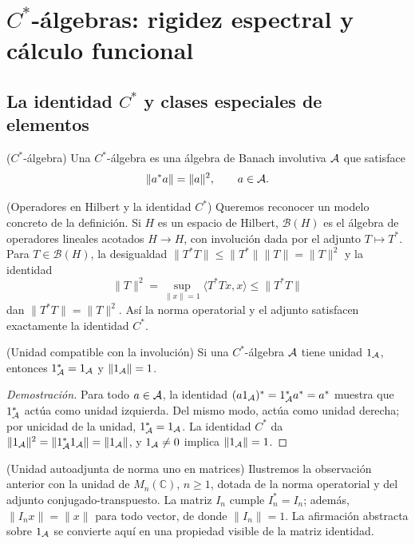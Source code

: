 \chapter{$C^*$-álgebras: rigidez espectral y cálculo funcional}

\section{La identidad $C^*$ y clases especiales de elementos}

\begin{cthdefinicion}{($C^*$-álgebra)}
Una $C^*$-álgebra es una álgebra de Banach involutiva $\mathcal A$ que satisface
\[
 \|a^*a\|=\|a\|^2,
 \qquad a\in\mathcal A.
\]
\end{cthdefinicion}

\begin{cthejemplo}{(Operadores en Hilbert y la identidad $C^*$)}
Queremos reconocer un modelo concreto de la definición. Si $H$ es un
espacio de Hilbert, $\mathcal B(H)$ es el álgebra de operadores lineales
acotados $H\to H$, con involución dada por el adjunto $T\mapsto T^*$.
Para $T\in\mathcal B(H)$, la desigualdad
$\|T^*T\|\le\|T^*\|\|T\|=\|T\|^2$ y la identidad
\[
 \|T\|^2=\sup_{\|x\|=1}\langle T^*Tx,x\rangle
 \le\|T^*T\|
\]
dan $\|T^*T\|=\|T\|^2$. Así la norma operatorial y el adjunto
satisfacen exactamente la identidad $C^*$.
\end{cthejemplo}

\begin{cthobservacion}{(Unidad compatible con la involución)}
Si una $C^*$-álgebra $\mathcal A$ tiene unidad $1_\mathcal A$, entonces
$1_\mathcal A^*=1_\mathcal A$ y $\|1_\mathcal A\|=1$.
\end{cthobservacion}

\begin{proof}[Demostración]
Para todo $a\in\mathcal A$, la identidad $(a1_\mathcal A)^*=1_\mathcal A^*a^*=a^*$ muestra que
$1_\mathcal A^*$ actúa como unidad izquierda. Del mismo modo, actúa como unidad
derecha; por unicidad de la unidad, $1_\mathcal A^*=1_\mathcal A$. La identidad $C^*$ da
$\|1_\mathcal A\|^2=\|1_\mathcal A^*1_\mathcal A\|=\|1_\mathcal A\|$, y $1_\mathcal A\ne0$ implica
$\|1_\mathcal A\|=1$.
\end{proof}

\begin{cthejemplo}{(Unidad autoadjunta de norma uno en matrices)}
Ilustremos la observación anterior con la unidad de
$M_n(\mathbb C)$, $n\ge1$, dotada de la norma operatorial y del
adjunto conjugado-transpuesto. La matriz $I_n$ cumple
$I_n^*=I_n$; además, $\|I_nx\|=\|x\|$ para todo vector, de donde
$\|I_n\|=1$. La afirmación abstracta sobre $1_\mathcal A$ se convierte aquí
en una propiedad visible de la matriz identidad.
\end{cthejemplo}

